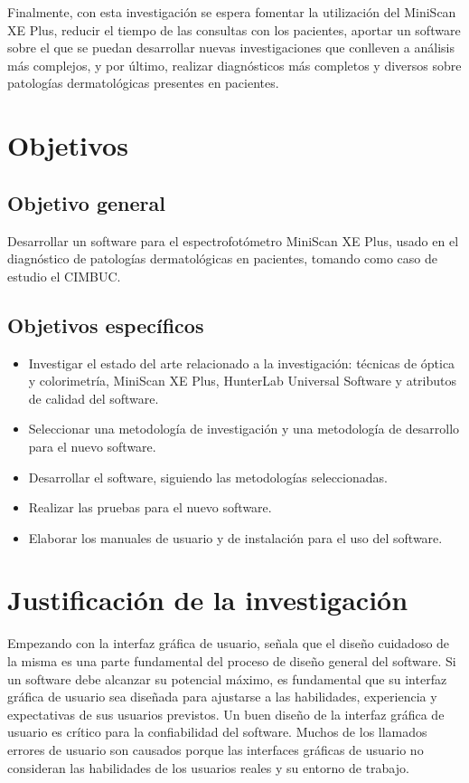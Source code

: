 Finalmente, con esta investigaci\'{o}n se espera fomentar la utilizaci\'{o}n del \mbox{MiniScan} XE Plus, reducir el tiempo de las consultas con los pacientes, aportar un software sobre el que se puedan desarrollar nuevas investigaciones que conlleven a an\'{a}lisis m\'{a}s complejos, y por \'{u}ltimo, realizar diagn\'{o}sticos m\'{a}s completos y diversos sobre patolog\'{i}as dermatol\'{o}gicas presentes en pacientes.

	\section{Objetivos}

		\subsection{Objetivo general}
	Desarrollar un software para el espectrofot\'{o}metro MiniScan XE Plus, usado en el diagn\'{o}stico de patolog\'{i}as dermatol\'{o}gicas en pacientes, tomando como caso de estudio el CIMBUC.
		\subsection{Objetivos espec\'{i}ficos}
			\begin{itemize}
				\item Investigar el estado del arte relacionado a la investigaci\'{o}n: t\'{e}cnicas de \'{o}ptica y colorimetr\'{i}a, MiniScan XE Plus, HunterLab Universal Software y atributos de calidad del software.
				
				\item Seleccionar una metodolog\'{i}a de investigaci\'{o}n y una metodolog\'{i}a de desarrollo para el nuevo software.
				
				\item Desarrollar el software, siguiendo las metodolog\'{i}as \mbox{seleccionadas}.
				
				\item Realizar las pruebas para el nuevo software.
				
				\item Elaborar los manuales de usuario y de instalaci\'{o}n para el uso del software.
			\end{itemize}
\newpage
	\section{Justificaci\'{o}n de la investigaci\'{o}n}
	
	Empezando con la interfaz gr\'{a}fica de usuario, \cite{Sommerville} se\~{n}ala que el dise\~{n}o cuidadoso de la misma es una parte fundamental del proceso de dise\~{n}o general del software. Si un software debe alcanzar su potencial m\'{a}ximo, es fundamental que su interfaz gr\'{a}fica de usuario sea dise\~{n}ada para ajustarse a las habilidades, experiencia y expectativas de sus usuarios previstos. Un buen dise\~{n}o de la interfaz gr\'{a}fica de usuario es cr\'{i}tico para la confiabilidad del software. Muchos de los llamados errores de usuario son causados porque las interfaces gr\'{a}ficas de usuario no consideran las habilidades de los usuarios reales y su entorno de trabajo.

